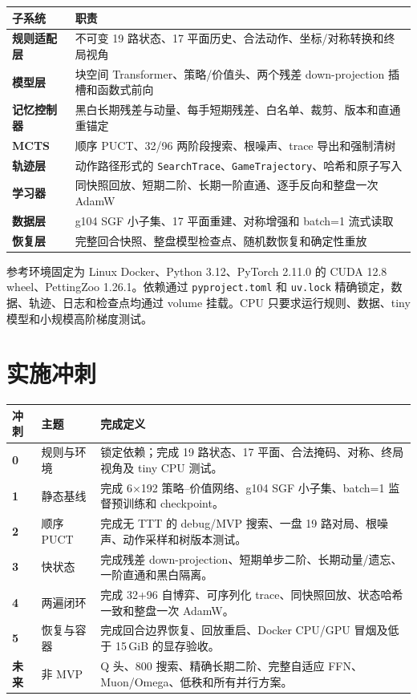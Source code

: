 \documentclass[UTF8,11pt,a4paper]{ctexart}
\newcommand{\code}[1]{\texttt{#1}}
\begin{document}
\begin{longtable}{>{\bfseries\color{Primary}}p{}>{\raggedright\arraybackslash}p{}}
\toprule
子系统 & 职责 \\
\midrule
规则适配层 & 不可变 19 路状态、17 平面历史、合法动作、坐标/对称转换和终局视角 \\
模型层 & 6 块空间 Transformer、策略/价值头、两个残差 down-projection 插槽和函数式前向 \\
记忆控制器 & 黑白长期残差与动量、每手短期残差、白名单、裁剪、版本和直通重锚定 \\
MCTS & 顺序 PUCT、32/96 两阶段搜索、根噪声、trace 导出和强制清树 \\
轨迹层 & 动作路径形式的 \code{SearchTrace}、\code{GameTrajectory}、哈希和原子写入 \\
学习器 & 同快照回放、短期二阶、长期一阶直通、逐手反向和整盘一次 AdamW \\
数据层 & g104 SGF 小子集、17 平面重建、对称增强和 batch=1 流式读取 \\
恢复层 & 完整回合快照、整盘模型检查点、随机数恢复和确定性重放 \\
\bottomrule
\end{longtable}

参考环境固定为 Linux Docker、Python 3.12、PyTorch 2.11.0 的 CUDA 12.8 wheel\cite{pytorch211}、PettingZoo 1.26.1\cite{pettingzoo-version}。依赖通过 \code{pyproject.toml} 和 \code{uv.lock} 精确锁定，数据、轨迹、日志和检查点均通过 volume 挂载。CPU 只要求运行规则、数据、tiny 模型和小规模高阶梯度测试。

\section{实施冲刺}

\begin{longtable}{>{\bfseries}p{}p{}>{\raggedright\arraybackslash}p{}}
\toprule
冲刺 & 主题 & 完成定义 \\
\midrule
0 & 规则与环境 & 锁定依赖；完成 19 路状态、17 平面、合法掩码、对称、终局视角及 tiny CPU 测试。 \\
1 & 静态基线 & 完成 6$\times$192 策略--价值网络、g104 SGF 小子集、batch=1 监督预训练和 checkpoint。 \\
2 & 顺序 PUCT & 完成无 TTT 的 debug/MVP 搜索、一盘 19 路对局、根噪声、动作采样和树版本测试。 \\
3 & 快状态 & 完成残差 down-projection、短期单步二阶、长期动量/遗忘、一阶直通和黑白隔离。 \\
4 & 两遍闭环 & 完成 32+96 自博弈、可序列化 trace、同快照回放、状态哈希一致和整盘一次 AdamW。 \\
5 & 恢复与容器 & 完成回合边界恢复、回放重启、Docker CPU/GPU 冒烟及低于 15\,GiB 的显存验收。 \\
未来 & 非 MVP & Q 头、800 搜索、精确长期二阶、完整自适应 FFN、Muon/Omega、低秩和所有并行方案。 \\
\bottomrule
\end{longtable}
\end{document}
